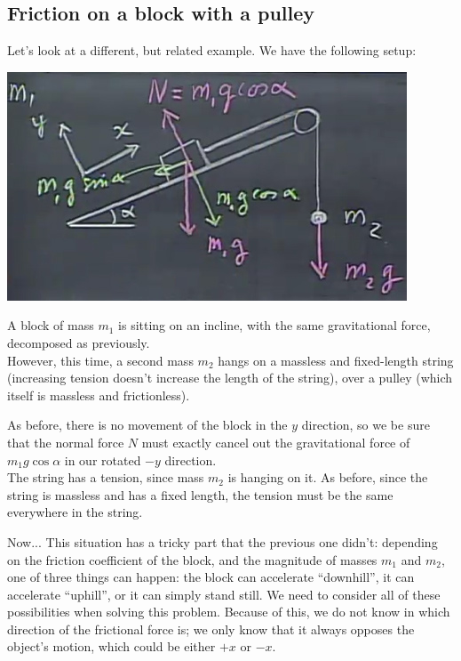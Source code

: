 \documentclass[12pt,a4paper]{report}
\begin{document}
\subsection{Friction on a block with a pulley}

Let's look at a different, but related example. We have the following setup:

\begin{center}
\includegraphics[scale=0.8]{Graphics/lec8_friction_pulley}
\end{center}

A block of mass $m_1$ is sitting on an incline, with the same gravitational force, decomposed as previously.\\
However, this time, a second mass $m_2$ hangs on a massless and fixed-length string (increasing tension doesn't increase the length of the string), over a pulley (which itself is massless and frictionless).

As before, there is no movement of the  block in the $y$ direction, so we be sure that the normal force $N$ must exactly cancel out the gravitational force of $m_1 g \cos \alpha$ in our rotated $-y$ direction.\\
The string has a tension, since mass $m_2$ is hanging on it. As before, since the string is massless and has a fixed length, the tension must be the same everywhere in the string.

Now... This situation has a tricky part that the previous one didn't: depending on the friction coefficient of the block, and the magnitude of masses $m_1$ and $m_2$, one of three things can happen: the block can accelerate ``downhill'', it can accelerate ``uphill'', or it can simply stand still. We need to consider all of these possibilities when solving this problem. Because of this, we do not know in which direction of the frictional force is; we only know that it always opposes the object's motion, which could be either $+x$ or $-x$.
\end{document}
